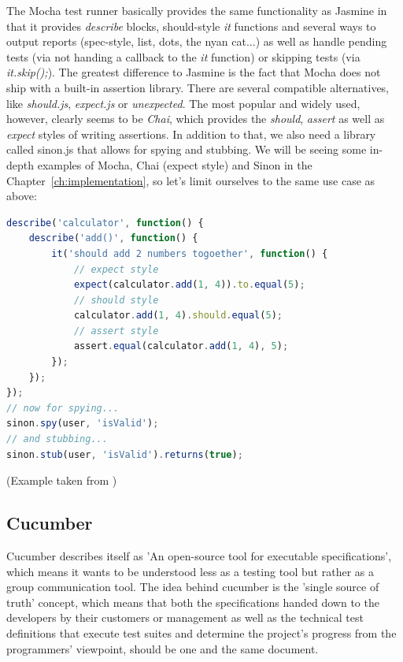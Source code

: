 	The Mocha test runner basically provides the same functionality as Jasmine in that it provides \textit{describe} blocks, should-style \textit{it} functions and several ways to output reports (spec-style, list, dots, the nyan cat...) as well as handle pending tests (via not handing a callback to the \textit{it} function) or skipping tests (via \textit{it.skip();}). The greatest difference to Jasmine is the fact that Mocha does not ship with a built-in assertion library. There are several compatible alternatives, like \textit{should.js}, \textit{expect.js} or \textit{unexpected}. The most popular and widely used, however, clearly seems to be \textit{Chai}, which provides the \textit{should}, \textit{assert} as well as \textit{expect} styles of writing assertions. In addition to that, we also need a library called sinon.js that allows for spying and stubbing. We will be seeing some in-depth examples of Mocha, Chai (expect style) and Sinon in the Chapter~\ref{ch:implementation}, so let's limit ourselves to the same use case as above:
	
	\begin{lstlisting}[caption={Mocha example of a nested test suite containing one simple assertion in expect style as well as a spy and a stub}, label={lst:mocha_chai_sinon}, language=JavaScript]
describe('calculator', function() {
	describe('add()', function() {
		it('should add 2 numbers togoether', function() {
			// expect style
			expect(calculator.add(1, 4)).to.equal(5);
			// should style
			calculator.add(1, 4).should.equal(5);
			// assert style
			assert.equal(calculator.add(1, 4), 5);
		});
	});
});
// now for spying...
sinon.spy(user, 'isValid');
// and stubbing...
sinon.stub(user, 'isValid').returns(true);
	\end{lstlisting}
	\small
	(Example taken from \citep{JSTestTest})

	\subsection{Cucumber}
	\label{ssect:selenium}
	
	Cucumber describes itself as 'An open-source tool for executable specifications', which means it wants to be understood less as a testing tool but rather as a group communication tool. The idea behind cucumber is the 'single source of truth' concept, which means that both the specifications handed down to the developers by their customers or management as well as the technical test definitions that execute test suites and determine the project's progress from the programmers' viewpoint, should be one and the same document.
	
